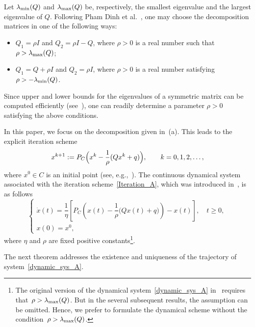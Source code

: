 \documentclass[11pt]{article}
\theoremstyle{definition}
\theoremstyle{remark}
\begin{document}
Let $\lambda_{\rm min}(Q)$ and $\lambda_{\rm max}(Q)$ be, respectively, the smallest eigenvalue and the largest eigenvalue of $Q$. Following Pham Dinh et al.~\cite{PhamDinh_LeThi98,PhamDinh_LeThi_Akoa}, one may choose the decomposition matrices in one of the following ways:
\begin{itemize}
	\item[(a)]
	$Q_1=\rho I$ and $Q_2=\rho I-Q$, where $\rho >0$ is a real number such that $\rho>\lambda_{\rm max}(Q)$;
	
	\item[(b)]
	$Q_1=Q+\rho I$ and $Q_2=\rho I$, where $\rho >0$ is a real number satisfying $\rho>-\lambda_{\rm min}(Q)$.
\end{itemize}

Since upper and lower bounds for the eigenvalues of a symmetric matrix can be computed efficiently (see~\cite[estimate~(a) or estimate~(b), p.~418]{Stoer_Bulirsch_1980}), one can readily determine a parameter $\rho>0$ satisfying the above conditions.

\medskip

In this paper, we focus on the decomposition given in~(a). This leads to the explicit iteration scheme
\begin{equation}\label{Iteration_A}
	x^{k+1}
	:=
	P_C\Bigl(
	x^k-\frac{1}{\rho}(Qx^k+q)
	\Bigr),
	\qquad
	k=0,1,2,\dots,
\end{equation}
where $x^0\in C$ is an initial point (see, e.g.,~\cite{PhamDinh_LeThi_Akoa}). The continuous dynamical system associated with the iteration scheme~\eqref{Iteration_A}, which was introduced in~\cite{pty_2025}, is as follows
\begin{equation}\label{dynamic_sys_A}
	\begin{cases}
		\dot{x}(t)
		=
		\dfrac{1}{\eta}
		\left[
		P_C\left(
		x(t)-\dfrac{1}{\rho}\big(Qx(t)+q\big)
		\right)
		-x(t)
		\right],
		\quad t\geq 0,
		\\[2ex]
		x(0)=x^0,
	\end{cases}
\end{equation}
where $\eta$ and $\rho$ are fixed positive constants\footnote{The original version of the dynamical system~\eqref{dynamic_sys_A} in~\cite{pty_2025} requires that~$\rho>\lambda_{\rm max}(Q)$. But in the several subsequent results, the assumption can be omitted. Hence, we prefer to formulate the dynamical scheme without the condition~$\rho>\lambda_{\rm max}(Q)$.}.

The next theorem addresses the existence and uniqueness of the trajectory of system~\eqref{dynamic_sys_A}.
\end{document}
